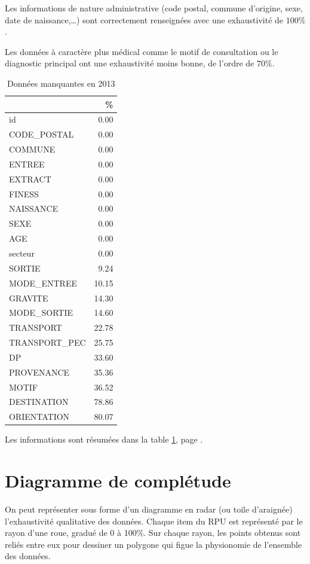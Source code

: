 \documentclass[12pt,english,french,twoside]{report}\usepackage[]{graphicx}\usepackage[]{color}
\begin{document}
Les informations de nature administrative (code postal, commune d'origine, sexe, date de naissance,\dots ) sont correctement renseignées avec une exhaustivité de $100\%$.

Les données à caractère plus médical comme le motif de consultation ou le diagnostic principal ont une exhaustivité moins bonne, de l'ordre de $70\%$.

\begin{table}[ht]
\centering
\begin{tabular}{|l|r|}
  \hline
 & \% \\ 
  \hline
id & 0.00 \\ 
  CODE\_POSTAL & 0.00 \\ 
  COMMUNE & 0.00 \\ 
  ENTREE & 0.00 \\ 
  EXTRACT & 0.00 \\ 
  FINESS & 0.00 \\ 
  NAISSANCE & 0.00 \\ 
  SEXE & 0.00 \\ 
  AGE & 0.00 \\ 
  secteur & 0.00 \\ 
  SORTIE & 9.24 \\ 
  MODE\_ENTREE & 10.15 \\ 
  GRAVITE & 14.30 \\ 
  MODE\_SORTIE & 14.60 \\ 
  TRANSPORT & 22.78 \\ 
  TRANSPORT\_PEC & 25.75 \\ 
  DP & 33.60 \\ 
  PROVENANCE & 35.36 \\ 
  MOTIF & 36.52 \\ 
  DESTINATION & 78.86 \\ 
  ORIENTATION & 80.07 \\ 
   \hline
\end{tabular}
\caption{Données manquantes en 2013} 
\label{tab2}
\end{table}



Les informations sont résumées dans la table \ref{tab2}, page \pageref{tab2}.

\section{Diagramme de complétude}

On peut représenter sous forme d'un diagramme en radar (ou toile d'araignée) l'exhaustivité qualitative des données. Chaque item du RPU est représenté par le rayon d'une roue, gradué de 0 à 100\%. Sur chaque rayon, les points obtenus sont reliés entre eux pour dessiner un polygone qui figue la physionomie de l'ensemble des données.
\end{document}
